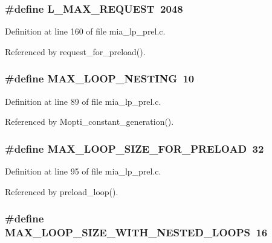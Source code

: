 \subsubsection{\setlength{\rightskip}{0pt plus 5cm}\#define L\_\-MAX\_\-REQUEST~2048}\label{mia__lp__prel_8c_7c5f7f8fbb899748dc21279096396b11}




Definition at line 160 of file mia\_\-lp\_\-prel.c.

Referenced by request\_\-for\_\-preload().
\subsubsection{\setlength{\rightskip}{0pt plus 5cm}\#define MAX\_\-LOOP\_\-NESTING~10}\label{mia__lp__prel_8c_884f45876d5ae7e312160cc16042bb06}




Definition at line 89 of file mia\_\-lp\_\-prel.c.

Referenced by Mopti\_\-constant\_\-generation().
\subsubsection{\setlength{\rightskip}{0pt plus 5cm}\#define MAX\_\-LOOP\_\-SIZE\_\-FOR\_\-PRELOAD~32}\label{mia__lp__prel_8c_afb2c1d818f840b067728f20bc3c09bb}




Definition at line 95 of file mia\_\-lp\_\-prel.c.

Referenced by preload\_\-loop().
\subsubsection{\setlength{\rightskip}{0pt plus 5cm}\#define MAX\_\-LOOP\_\-SIZE\_\-WITH\_\-NESTED\_\-LOOPS~16}\label{mia__lp__prel_8c_bc069227c45c46cae6d764fe701257a7}




